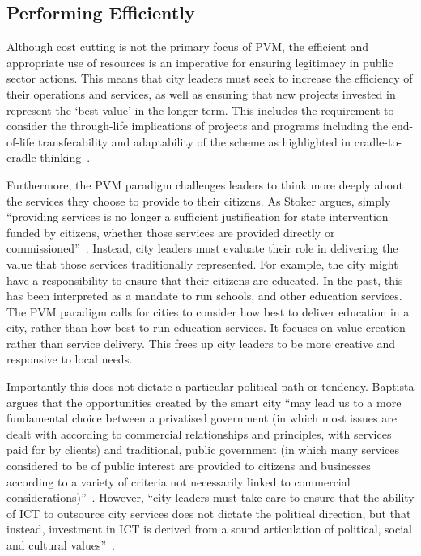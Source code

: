 \documentclass[conference]{IEEEtran}
\begin{document}
\subsection{Performing Efficiently}
Although cost cutting is not the primary focus of PVM, the efficient
and appropriate use of resources is an imperative for ensuring
legitimacy in public sector actions. This means that city leaders must
seek to increase the efficiency of their operations and services, as
well as ensuring that new projects invested in represent the ‘best
value’ in the longer term. This includes the requirement to consider
the through-life implications of projects and programs including the
end-of-life transferability and adaptability of the scheme as
highlighted in cradle-to-cradle
thinking~\cite{mcdonough+braungart:2009}.

Furthermore, the PVM paradigm challenges leaders to think more deeply
about the services they choose to provide to their citizens. As Stoker
argues, simply ``providing services is no longer a sufficient
justification for state intervention funded by citizens, whether those
services are provided directly or
commissioned''~\cite{stoker:2006}. Instead, city leaders must evaluate
their role in delivering the value that those services traditionally
represented. For example, the city might have a responsibility to
ensure that their citizens are educated. In the past, this has been
interpreted as a mandate to run schools, and other education
services. The PVM paradigm calls for cities to consider how best to
deliver education in a city, rather than how best to run education
services. It focuses on value creation rather than service
delivery. This frees up city leaders to be more creative and
responsive to local needs.

Importantly this does not dictate a particular political path or
tendency. Baptista argues that the opportunities created by the smart
city ``may lead us to a more fundamental choice between a privatised
government (in which most issues are dealt with according to
commercial relationships and principles, with services paid for by
clients) and traditional, public government (in which many services
considered to be of public interest are provided to citizens and
businesses according to a variety of criteria not necessarily linked
to commercial considerations)''~\cite{baptista:2005}. However, ``city
leaders must take care to ensure that the ability of ICT to outsource
city services does not dictate the political direction, but that
instead, investment in ICT is derived from a sound articulation of
political, social and cultural values''~\cite{cosgrave+tryfonas:2012}.
\end{document}
